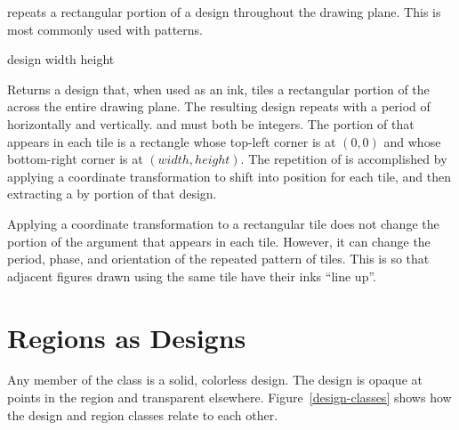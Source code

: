  repeats a rectangular portion of a design throughout the
drawing plane.  This is most commonly used with patterns.

 {design width height}

Returns a design that, when used as an ink, tiles a rectangular portion of the
  across the entire drawing plane.  The resulting
design repeats with a period of  horizontally and 
vertically.   and  must both be integers.  The portion of
 that appears in each tile is a rectangle whose top-left corner is
at $(0,0)$ and whose bottom-right corner is at $(width,height)$.  The repetition
of  is accomplished by applying a coordinate transformation to shift
 into position for each tile, and then extracting a  by
 portion of that design.

Applying a coordinate transformation to a rectangular tile does not change the
portion of the argument  that appears in each tile.  However, it can
change the period, phase, and orientation of the repeated pattern of tiles.
This is so that adjacent figures drawn using the same tile have their inks
``line up''.


\section {Regions as Designs}

Any member of the class  is a solid, colorless design.  The design is
opaque at points in the region and transparent elsewhere.
Figure~\ref{design-classes} shows how the design and region classes relate to
each other.

